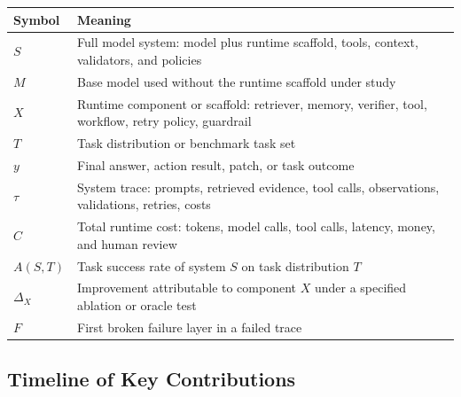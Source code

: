 \begin{center}
\begin{tabularx}{\textwidth}{@{}lX@{}}
\toprule
Symbol & Meaning \\
\midrule
$S$ & Full model system: model plus runtime scaffold, tools, context, validators, and policies \\
$M$ & Base model used without the runtime scaffold under study \\
$X$ & Runtime component or scaffold: retriever, memory, verifier, tool, workflow, retry policy, guardrail \\
$T$ & Task distribution or benchmark task set \\
$y$ & Final answer, action result, patch, or task outcome \\
$\tau$ & System trace: prompts, retrieved evidence, tool calls, observations, validations, retries, costs \\
$C$ & Total runtime cost: tokens, model calls, tool calls, latency, money, and human review \\
$A(S,T)$ & Task success rate of system $S$ on task distribution $T$ \\
$\Delta_X$ & Improvement attributable to component $X$ under a specified ablation or oracle test \\
$F$ & First broken failure layer in a failed trace \\
\bottomrule
\end{tabularx}
\end{center}

\subsection*{Timeline of Key Contributions}

